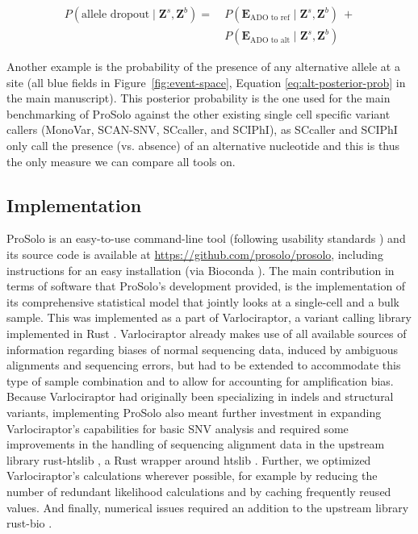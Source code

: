 \documentclass[authoryear,preprint,11pt]{scrartcl}
\newcommand{\Prob}{{P}}
\begin{document}
\begin{equation}
 \label{eq:ado-posterior-prob}
 \begin{split}
  \Prob(\text{allele dropout} \mid \boldsymbol{Z}^s,\boldsymbol{Z}^b) =~&
    \Prob(\boldsymbol{E}_{\text{ADO to ref}} \mid \boldsymbol{Z}^s,\boldsymbol{Z}^b)~+ \\
  &\Prob(\boldsymbol{E}_{\text{ADO to alt}} \mid \boldsymbol{Z}^s,\boldsymbol{Z}^b)
 \end{split}
\end{equation}


Another example is the probability of the presence of any alternative allele at a site (all blue fields in Figure~\ref{fig:event-space}, Equation \ref{eq:alt-posterior-prob} in the main manuscript).
This posterior probability is the one used for the main benchmarking of ProSolo against the other existing single cell specific variant callers (MonoVar, SCAN-SNV, SCcaller, and SCIPhI), as SCcaller and SCIPhI only call the presence (vs. absence) of an alternative nucleotide and this is thus the only measure we can compare all tools on.


\subsection{Implementation} \label{sec:implementation}

ProSolo is an easy-to-use command-line tool (following usability standards \citep{taschuk_ten_2017}) and its source code is available at \url{https://github.com/prosolo/prosolo}, including instructions for an easy installation (via Bioconda \citep{gruning_bioconda:_2018}). 
The main contribution in terms of software that ProSolo's development provided, is the implementation of its comprehensive statistical model that jointly looks at a single-cell and a bulk sample.
This was implemented as a part of Varlociraptor, a variant calling library implemented in Rust \citep{koster_varlociraptor_2020}.
Varlociraptor already makes use of all available sources of information regarding biases of normal sequencing data, induced by ambiguous alignments and sequencing errors, but had to be extended to accommodate this type of sample combination and to allow for accounting for amplification bias.
Because Varlociraptor had originally been specializing in indels and structural variants, implementing ProSolo also meant further investment in expanding Varlociraptor's capabilities for basic SNV analysis and required some improvements in the handling of sequencing alignment data in the upstream library rust-htslib \citep{rust-htslib_htslib_nodate}, a Rust wrapper around htslib \citep{htslib_c_nodate}. 
Further, we optimized Varlociraptor's calculations wherever possible, for example by reducing the number of redundant likelihood calculations and by caching frequently reused values.
And finally, numerical issues required an addition to the upstream library rust-bio \citep{koster_rust-bio:_2016}. 
\end{document}
